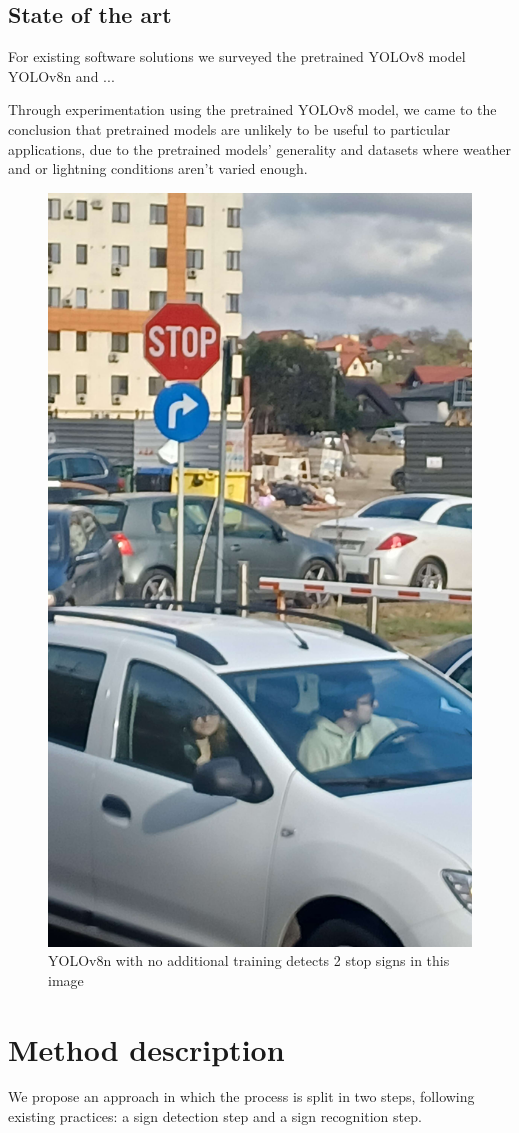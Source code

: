 \documentclass[conference]{IEEEtran}
\begin{document}
\subsection{State of the art}

For existing software solutions we surveyed the pretrained YOLOv8 model YOLOv8n and ...

Through experimentation using the pretrained YOLOv8 model, we came to the conclusion that pretrained
models are unlikely to be useful to particular applications, due to the pretrained models' generality
and datasets where weather and or lightning conditions aren't varied enough.

\begin{figure}[h!]
    \centerline{\includegraphics[width=0.5\linewidth,]{poza-fata-ac}}
    \caption{YOLOv8n with no additional training detects 2 stop signs in this image}
\end{figure}

\section{Method description}

We propose an approach in which the process is split in two steps, following existing practices:
a sign detection step and a sign recognition step.



\end{document}
